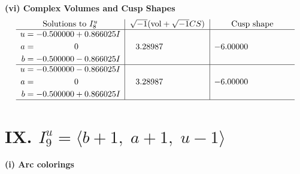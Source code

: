 \documentclass[1p]{elsarticle_modified}
\theoremstyle{definition}
\newcommand{\I}{\sqrt{-1}}
\begin{document}
\newpage\flushleft \textbf{(vi) Complex Volumes and Cusp Shapes}
$$\begin{array}{c|c|c}  
\text{Solutions to }I^u_{8}& \I (\text{vol} + \sqrt{-1}CS) & \text{Cusp shape}\\
 \hline 
\begin{aligned}
u &= -0.500000 + 0.866025 I \\
a &= \phantom{-0.000000 } 0 \\
b &= -0.500000 - 0.866025 I\end{aligned}
 & \phantom{-}3.28987\phantom{ +0.000000I} & -6.00000\phantom{ +0.000000I} \\ \hline\begin{aligned}
u &= -0.500000 - 0.866025 I \\
a &= \phantom{-0.000000 } 0 \\
b &= -0.500000 + 0.866025 I\end{aligned}
 & \phantom{-}3.28987\phantom{ +0.000000I} & -6.00000\phantom{ +0.000000I}\\
 \hline 
 \end{array}$$\newpage\newpage\renewcommand{\arraystretch}{1}
\centering \section*{IX. $I^u_{9}= \langle b+1,\;a+1,\;u-1 \rangle$}
\flushleft \textbf{(i) Arc colorings}\\
\end{document}
